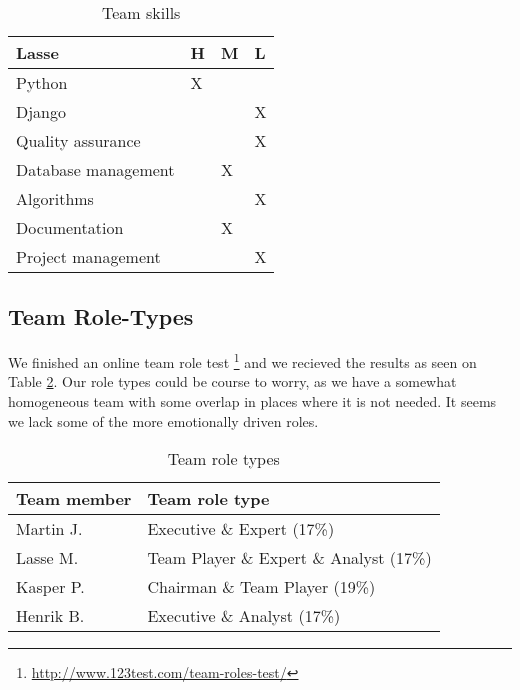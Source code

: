 \begin{table}[!ht]
{        \centering
        \small
        \begin{tabular}{l|l|l|l}
            \rowcolor{Gray}
            \textbf{Lasse} & \textbf{H} & \textbf{M} & \textbf{L}\\\hline
             Python & X & &\\
             Django & & & X\\
             Quality assurance & & & X\\
             Database management & & X &\\
             Algorithms & & & X\\
             Documentation & & X &\\
             Project management & & & X
        \end{tabular}
        }%
    \caption{Team skills}
    \label{tab:skills}
\end{table}


\subsection{Team Role-Types}
We finished an online team role test \footnote{\url{http://www.123test.com/team-roles-test/}} and we recieved the results as seen on 
Table \ref{tab:roleTypes}. Our role types could be course to worry, as we have a somewhat homogeneous team with some overlap in places where
it is not needed. It seems we lack some of the more emotionally driven roles.
\begin{table}[!ht]
    \centering
    \begin{tabular}{l|l}
        \rowcolor{Gray}
        \textbf{Team member} & \textbf{Team role type}\\\hline
        Martin J.            & Executive \& Expert (17\%) \\
        Lasse M.             & Team Player \& Expert \& Analyst (17\%) \\
        Kasper P.            & Chairman \& Team Player (19\%) \\
        Henrik B.            & Executive \& Analyst (17\%)
    \end{tabular}
    \caption{Team role types}
    \label{tab:roleTypes}
\end{table}
